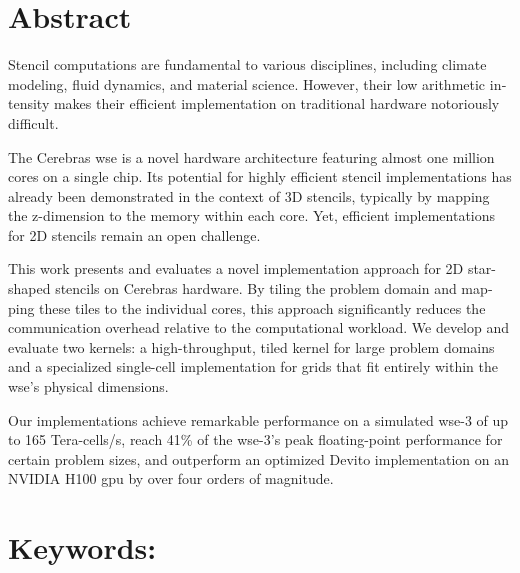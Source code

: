 \begin{otherlanguage}{english}
\section*{Abstract}
Stencil computations are fundamental to various disciplines, including climate modeling, fluid dynamics, and material science.
However, their low arithmetic intensity makes their efficient implementation on traditional hardware notoriously difficult.

The Cerebras \acf{wse} is a novel hardware architecture featuring almost one million cores on a single chip. Its potential for highly efficient stencil implementations has already been demonstrated in the context of 3D stencils, typically by mapping the z-dimension to the memory within each core. Yet, efficient implementations for 2D stencils remain an open challenge.

This work presents and evaluates a novel implementation approach for 2D star-shaped stencils on Cerebras hardware. By tiling the problem domain and mapping these tiles to the individual cores, this approach significantly reduces the communication overhead relative to the computational workload. We develop and evaluate two kernels: a high-throughput, tiled kernel for large problem domains and a specialized single-cell implementation for grids that fit entirely within the \ac{wse}'s physical dimensions.

Our implementations achieve remarkable performance on a simulated \ac{wse}-3 of up to 165 Tera-cells/s, reach 41\% of the \ac{wse}-3's peak floating-point performance for certain problem sizes, and outperform an optimized Devito implementation on an NVIDIA H100 \ac{gpu} by over four orders of magnitude. 
\section*{Keywords:} \itshape \englishkeywords
\end{otherlanguage}